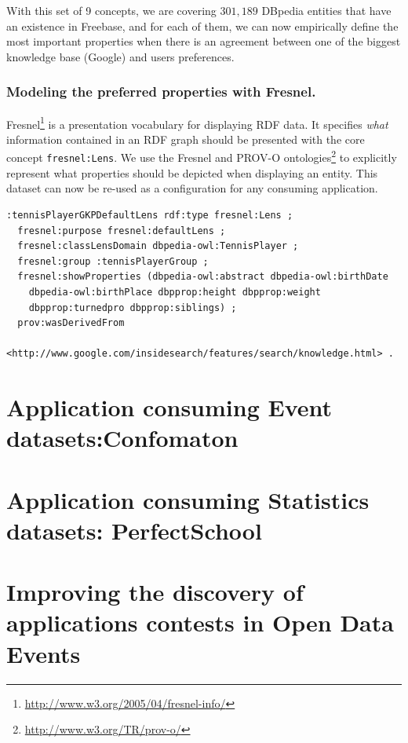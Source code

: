\begin{table}[!htp]
\end{table}\normalsize

With this set of 9 concepts, we are covering $301,189$ DBpedia entities that have an existence in Freebase, and for each of them, we can now empirically define the most important properties when there is an agreement between one of the biggest knowledge base (Google) and users preferences.

\subsubsection{Modeling the preferred properties with Fresnel.}
\label{sec:fresnel}
Fresnel\footnote{\url{http://www.w3.org/2005/04/fresnel-info/}} is a presentation vocabulary for displaying RDF data. It specifies \textit{what} information contained in an RDF graph should be presented with the core concept \texttt{fresnel:Lens}. We use the Fresnel and PROV-O ontologies\footnote{\url{http://www.w3.org/TR/prov-o/}} to explicitly represent what properties should be depicted when displaying an entity. This dataset can now be re-used as a configuration for any consuming application.

\begin{lstlisting}
:tennisPlayerGKPDefaultLens rdf:type fresnel:Lens ;
  fresnel:purpose fresnel:defaultLens ;
  fresnel:classLensDomain dbpedia-owl:TennisPlayer ;
  fresnel:group :tennisPlayerGroup ;
  fresnel:showProperties (dbpedia-owl:abstract dbpedia-owl:birthDate
    dbpedia-owl:birthPlace dbpprop:height dbpprop:weight
    dbpprop:turnedpro dbpprop:siblings) ;
  prov:wasDerivedFrom
    <http://www.google.com/insidesearch/features/search/knowledge.html> .	
\end{lstlisting}
\normalsize

\section{Application consuming Event datasets:Confomaton}
\label{sec:confomaton}



\section{Application consuming Statistics datasets: PerfectSchool}
\label{sec:perfectSchool}



\section{Improving the discovery of applications contests in Open Data Events}
\label{sec:contests}

